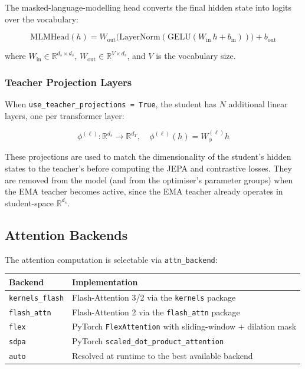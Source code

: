 \documentclass[11pt,a4paper]{article}
\begin{document}
The masked-language-modelling head converts the final hidden state into logits over the vocabulary:

\begin{equation}
  \mathrm{MLMHead}(h) = W_{\mathrm{out}}\bigl(\mathrm{LayerNorm}(\mathrm{GELU}(W_{\mathrm{in}}\, h + b_{\mathrm{in}}))\bigr) + b_{\mathrm{out}}
\end{equation}

where $W_{\mathrm{in}} \in \mathbb{R}^{d_s \times d_s}$,
$W_{\mathrm{out}} \in \mathbb{R}^{V \times d_s}$, and $V$ is the vocabulary size.

\subsubsection{Teacher Projection Layers}

When \texttt{use\_teacher\_projections = True}, the student has $N$ additional linear layers, one
per transformer layer:

\begin{equation}
  \phi^{(\ell)} : \mathbb{R}^{d_s} \to \mathbb{R}^{d_T}, \quad \phi^{(\ell)}(h) = W_{\phi}^{(\ell)} h
\end{equation}

These projections are used to match the dimensionality of the student's hidden states to the
teacher's before computing the JEPA and contrastive losses.  They are removed from the model
(and from the optimiser's parameter groups) when the EMA teacher becomes active, since the EMA
teacher already operates in student-space $\mathbb{R}^{d_s}$.

\subsection{Attention Backends}
\label{sec:attn_backends}

The attention computation is selectable via \texttt{attn\_backend}:

\begin{center}
\begin{tabular}{ll}
\toprule
\textbf{Backend} & \textbf{Implementation} \\
\midrule
\texttt{kernels\_flash} & Flash-Attention 3/2 via the \texttt{kernels} package \\
\texttt{flash\_attn}    & Flash-Attention 2 via the \texttt{flash\_attn} package \\
\texttt{flex}           & PyTorch \texttt{FlexAttention} with sliding-window + dilation mask \\
\texttt{sdpa}           & PyTorch \texttt{scaled\_dot\_product\_attention} \\
\texttt{auto}           & Resolved at runtime to the best available backend \\
\bottomrule
\end{tabular}
\end{center}
\end{document}
